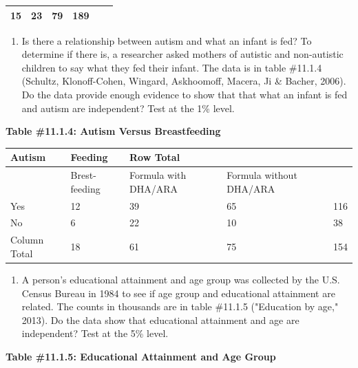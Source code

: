 \documentclass[]{book}
\providecommand{\tightlist}{%
  \setlength{\itemsep}{0pt}\setlength{\parskip}{0pt}}
\begin{document}
\begin{longtable}[]{@{}llllll@{}}
\begin{minipage}[t]{0.09\columnwidth}
15\strut
\end{minipage} & \begin{minipage}[t]{0.14\columnwidth}\raggedright
23\strut
\end{minipage} & \begin{minipage}[t]{0.12\columnwidth}\raggedright
79\strut
\end{minipage} & \begin{minipage}[t]{0.07\columnwidth}\raggedright
189\strut
\end{minipage}\tabularnewline
\bottomrule
\end{longtable}

\begin{enumerate}
\def\labelenumi{\arabic{enumi}.}
\setcounter{enumi}{2}
\tightlist
\item
  Is there a relationship between autism and what an infant is fed? To determine if there is, a researcher asked mothers of autistic and non-autistic children to say what they fed their infant. The data is in table \#11.1.4 (Schultz, Klonoff-Cohen, Wingard, Askhoomoff, Macera, Ji \& Bacher, 2006). Do the data provide enough evidence to show that that what an infant is fed and autism are independent? Test at the 1\% level.
\end{enumerate}

\textbf{Table \#11.1.4: Autism Versus Breastfeeding}

\begin{longtable}[]{@{}lllll@{}}
\toprule
Autism & Feeding & Row Total & &\tabularnewline
\midrule
\endhead
& Brest-feeding & Formula with DHA/ARA & Formula without DHA/ARA &\tabularnewline
Yes & 12 & 39 & 65 & 116\tabularnewline
No & 6 & 22 & 10 & 38\tabularnewline
Column Total & 18 & 61 & 75 & 154\tabularnewline
\bottomrule
\end{longtable}

\begin{enumerate}
\def\labelenumi{\arabic{enumi}.}
\setcounter{enumi}{3}
\tightlist
\item
  A person's educational attainment and age group was collected by the U.S. Census Bureau in 1984 to see if age group and educational attainment are related. The counts in thousands are in table \#11.1.5 ("Education by age," 2013). Do the data show that educational attainment and age are independent? Test at the 5\% level.
\end{enumerate}

\textbf{Table \#11.1.5: Educational Attainment and Age Group}
\end{document}
